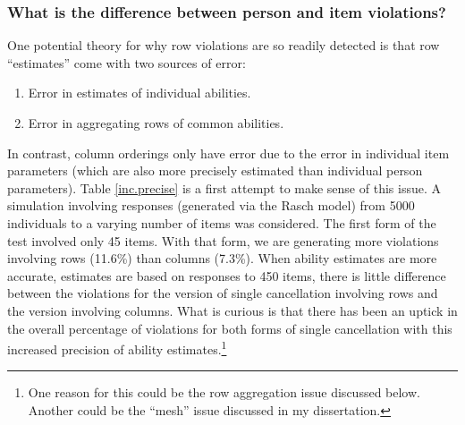 \documentclass[12pt]{article}
\begin{document}
\subsubsection{What is the difference between person and item violations?}
One potential theory for why row violations are so readily detected is that row ``estimates'' come with two sources of error:
\begin{enumerate}
\item Error in estimates of individual abilities.
\item Error in aggregating rows of common abilities.
\end{enumerate}
In contrast, column orderings only have error due to the error in individual item parameters (which are also more precisely estimated than individual person parameters). Table \ref{inc.precise} is a first attempt to make sense of this issue. A simulation involving responses (generated via the Rasch model) from  5000 individuals to a varying number of items was considered. The first form of the test involved only 45 items. With that form, we are generating more violations involving rows (11.6\%) than columns (7.3\%). When ability estimates are more accurate, estimates are based on responses to 450 items, there is little difference between the violations for the version of single cancellation involving rows and the version involving columns. What is curious is that there has been an uptick in the overall percentage of violations for both forms of single cancellation with this increased precision of ability estimates.\footnote{One reason for this could be the row aggregation issue discussed below. Another could be the ``mesh'' issue discussed in my dissertation.}
\end{document}

